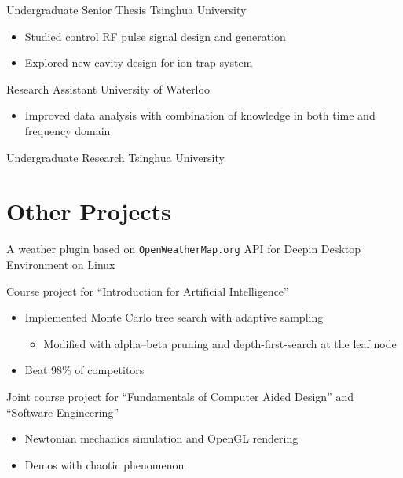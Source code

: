 \documentclass[11pt,letterpaper]{resume}
\begin{document}
Undergraduate Senior Thesis \hfill Tsinghua University
\begin{itemize}
    \item Studied control RF pulse signal design and generation
    \item Explored new cavity design for ion trap system
\end{itemize}\medskip

Research Assistant \hfill University of Waterloo
\begin{itemize}
    \item Improved data analysis with combination of knowledge in both time and frequency domain
\end{itemize}\medskip

Undergraduate Research \hfill Tsinghua University

\section{Other Projects}
A weather plugin based on \texttt{OpenWeatherMap.org} API for Deepin Desktop Environment on Linux\medskip

Course project for ``Introduction for Artificial Intelligence''
\begin{itemize}
    \item Implemented Monte Carlo tree search with adaptive sampling
    \begin{itemize}
        \item Modified with alpha–beta pruning and depth-first-search at 
        the leaf node
    \end{itemize}
    \item Beat 98\% of competitors
\end{itemize}\medskip

Joint course project for ``Fundamentals of Computer Aided Design'' and 
``Software Engineering''
\begin{itemize}
    \item Newtonian mechanics simulation and OpenGL rendering
    \item Demos with chaotic phenomenon
\end{itemize}
\end{document}
